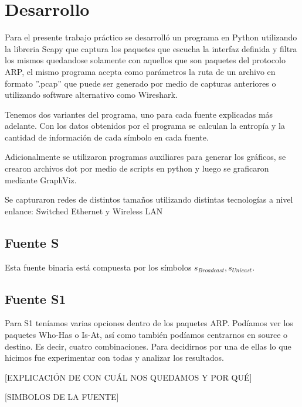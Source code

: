 \section{Desarrollo}

Para el presente trabajo práctico se desarrolló un programa en Python utilizando la libreria Scapy que captura los paquetes que escucha la interfaz definida y filtra los mismos quedandose solamente con aquellos que son paquetes del protocolo ARP, el mismo programa acepta como parámetros la ruta de un archivo en formato ''.pcap'' que puede ser generado por medio de capturas anteriores o utilizando software alternativo como Wireshark.

Tenemos dos variantes del programa, uno para cada fuente explicadas más adelante. Con los datos obtenidos por el programa se calculan la entropía y la cantidad de información de cada símbolo en cada fuente.

Adicionalmente se utilizaron programas auxiliares para generar los gráficos, se crearon archivos dot por medio de scripts en python y luego se graficaron mediante GraphViz.

Se capturaron redes de distintos tamaños utilizando distintas tecnologías a nivel enlance: Switched Ethernet y Wireless LAN


\subsection{Fuente S}
Esta fuente binaria está compuesta por los símbolos ${s_{Broadcast}, s_{Unicast}}$. 

\subsection{Fuente S1}
Para S1 teníamos varias opciones dentro de los paquetes ARP. Podíamos ver los paquetes Who-Has o Is-At, así como también podíamos centrarnos en source o destino. Es decir, cuatro combinaciones. Para decidirnos por una de ellas lo que hicimos fue experimentar con todas y analizar los resultados. 


[EXPLICACIÓN DE CON CUÁL NOS QUEDAMOS Y POR QUÉ]

[SIMBOLOS DE LA FUENTE]